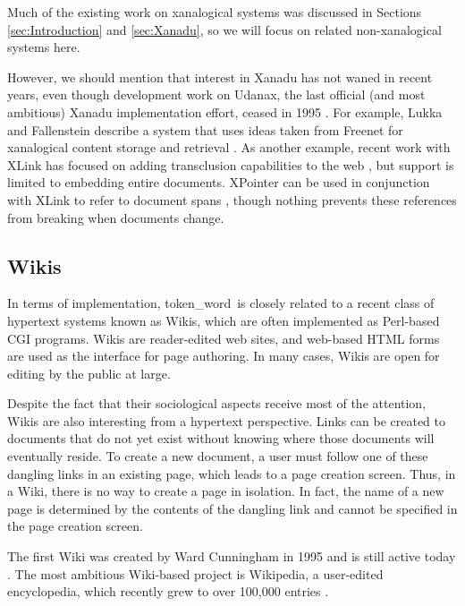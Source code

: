 \documentclass{acm_proc_article-sp}
\newcommand{\tokenWord}{token\_word}
\begin{document}
Much of the existing work on xanalogical systems was discussed in Sections \ref{sec:Introduction} and \ref{sec:Xanadu}, so we will focus on related non-xanalogical systems here.

However, we should mention that interest in Xanadu has not waned in recent years, even though development work on Udanax, the last official (and most ambitious) Xanadu implementation effort, ceased in 1995 \cite{Udanax}.
For example, Lukka and Fallenstein describe a system that uses ideas taken from Freenet for xanalogical content storage and retrieval \cite{FreenetXanadu}.
As another example, recent work with XLink has focused on adding transclusion capabilities to the web \cite{Lowe2001}, but support is limited to embedding entire documents.
XPointer can be used in conjunction with XLink to refer to document spans \cite{Vitali2002}, though nothing prevents these references from breaking when documents change.






\subsection{Wikis}

In terms of implementation, \tokenWord \  is closely related to a recent class of hypertext systems known as Wikis, which are often implemented as Perl-based CGI programs.
Wikis are reader-edited web sites, and web-based HTML forms are used as the interface for page authoring.
In many cases, Wikis are open for editing by the public at large.

Despite the fact that their sociological aspects receive most of the attention, Wikis are also interesting from a hypertext perspective.
Links can be created to documents that do not yet exist without knowing where those documents will eventually reside.
To create a new document, a user must follow one of these dangling links in an existing page, which leads to a page creation screen.
Thus, in a Wiki, there is no way to create a page in isolation.
In fact, the name of a new page is determined by the contents of the dangling link and cannot be specified in the page creation screen.



The first Wiki was created by Ward Cunningham in 1995 and is still active today \cite{WikiWikiWeb}.
The most ambitious Wiki-based project is Wikipedia, a user-edited encyclopedia, which recently grew to over 100,000 entries \cite{Wikipedia}.
\end{document}
